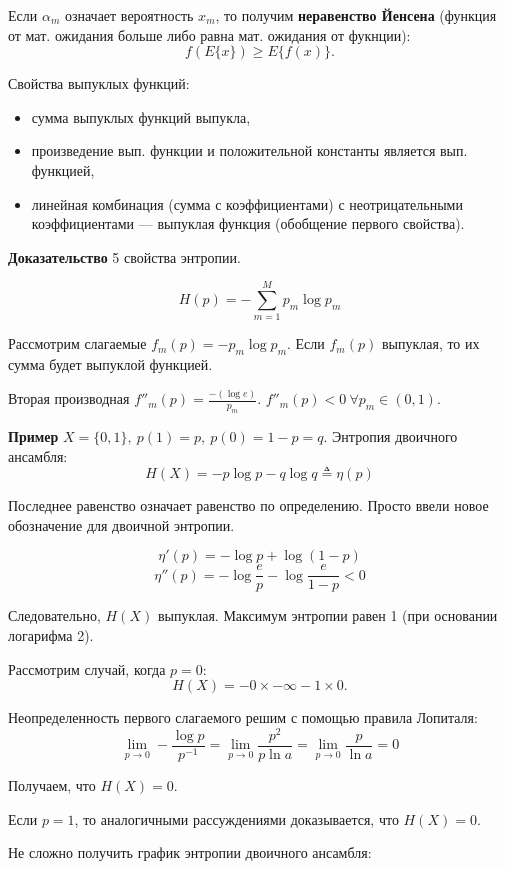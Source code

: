 Если $\alpha_m$ означает вероятность $x_m$, то получим \textbf{неравенство
Йенсена} (функция от мат. ожидания больше либо равна мат. ожидания от фукнции):
\[
    f(E\{x\}) \geq E\{f(x)\}.
\]

Свойства выпуклых функций:

\begin{itemize}
    \item сумма выпуклых функций выпукла,
    \item произведение вып. функции и положительной константы является вып.
        функцией,
    \item линейная комбинация (сумма с коэффициентами) с неотрицательными
        коэффициентами --- выпуклая функция (обобщение первого свойства).
\end{itemize}

\textbf{Доказательство} 5 свойства энтропии.

\[
    H(p) = - \sum_{m=1}^M p_m \log p_m
\]

Рассмотрим слагаемые $f_m(p) = - p_m \log p_m$.
Если $f_m(p)$ выпуклая, то их сумма будет выпуклой функцией.

Вторая производная $f''_m(p) = \frac{-(\log  e)}{p_m}$.
$f''_m(p) < 0\ \forall p_m \in (0, 1)$.

\textbf{Пример} $X = \{0, 1\},\ p(1) = p,\ p(0) = 1 - p = q$. Энтропия
двоичного ансамбля:
\[
    H(X) = -p \log p - q \log q \triangleq \eta(p)
\]

Последнее равенство означает равенство по определению. Просто ввели новое
обозначение для двоичной энтропии.

\[
    \eta'(p) = -\log p + \log(1 - p)
\]
\[
    \eta''(p) = -\log \frac{e}{p} - \log \frac{e}{1 - p} < 0
\]

Следовательно, $H(X)$ выпуклая. Максимум энтропии равен 1 (при основании
логарифма 2).

Рассмотрим случай, когда $p = 0$:
\[
    H(X) = - 0 \times - \infty - 1 \times 0. 
\]

Неопределенность первого слагаемого решим с помощью правила Лопиталя:
\[
    \lim_{p \to 0} - \frac{\log p}{p^{-1}} = 
    \lim_{p \to 0} \frac{p^2}{p \ln a} = 
    \lim_{p \to 0} \frac{p}{\ln a} = 0
\]

Получаем, что $H(X) = 0$.

Если $p = 1$, то аналогичными рассуждениями доказывается, что $H(X) = 0$.

Не сложно получить график энтропии двоичного ансамбля:


